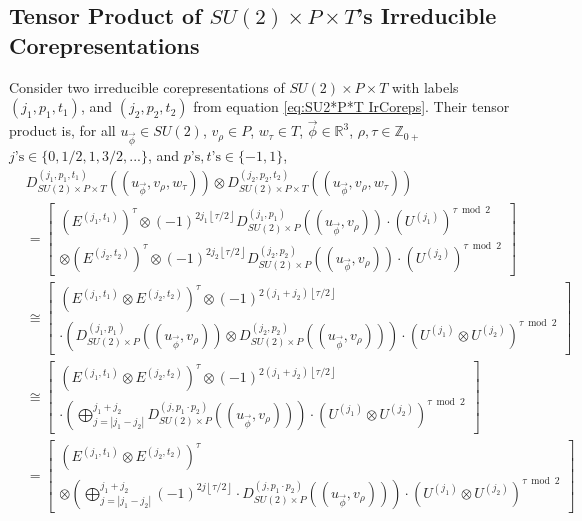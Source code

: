 \documentclass[preprint, 12pt]{revtex4-2}
\numberwithin{equation}{section}
\begin{document}
\subsection{Tensor Product of $SU(2)\times P\times T$'s Irreducible Corepresentations}
Consider two irreducible corepresentations of $SU(2)\times P\times T$ with labels $(j_1, p_1, t_1)$, and $(j_2, p_2, t_2)$ from equation \ref{eq:SU2*P*T IrCoreps}. Their tensor product is, for all $u_{\vec{\phi}}\in SU(2)$, $v_\rho \in P$, $w_\tau \in T$, $\vec{\phi}\in\mathbb{R}^3$, $\rho,\tau\in\mathbb{Z}_{0+}$ $j\text{'s}\in\{0, 1/2, 1, 3/2, ...\}$, and $p\text{'s}, t\text{'s}\in\{-1, 1\}$,
\begin{equation}
    \begin{aligned}
        &D^{(j_1,p_1,t_1)}_{SU(2)\times P\times T}((u_{\vec{\phi}}, v_\rho, w_\tau))\otimes D^{(j_2,p_2,t_2)}_{SU(2)\times P\times T}((u_{\vec{\phi}}, v_\rho, w_\tau)) \\
        &=  \left[\begin{multlined}
                \left(E^{(j_1,t_1)}\right)^\tau\otimes (-1)^{2j_1\left\lfloor \tau/2\right\rfloor} D_{SU(2)\times P}^{(j_1,p_1)}((u_{\vec{\phi}}, v_\rho))\cdot\left(U^{(j_1)}\right)^{\tau\bmod 2}\\ 
                \otimes \left(E^{(j_2,t_2)}\right)^\tau\otimes (-1)^{2j_2\left\lfloor \tau/2\right\rfloor}D_{SU(2)\times P}^{(j_2,p_2)}((u_{\vec{\phi}}, v_\rho))\cdot\left(U^{(j_2)}\right)^{\tau\bmod 2}
            \end{multlined}\right] \\
        &\cong  \left[\begin{multlined}
                    \left(E^{(j_1,t_1)}\otimes E^{(j_2,t_2)}\right)^\tau\otimes(-1)^{2(j_1+j_2)\left\lfloor \tau/2\right\rfloor}\\
                    \cdot \left(D_{SU(2)\times P}^{(j_1,p_1)}((u_{\vec{\phi}}, v_\rho))\otimes D_{SU(2)\times P}^{(j_2,p_2)}((u_{\vec{\phi}}, v_\rho))\right)\cdot\left(U^{(j_1)}\otimes U^{(j_2)}\right)^{\tau\bmod 2}
                \end{multlined}\right] \\
        &\cong  \left[\begin{multlined}
                    \left(E^{(j_1,t_1)}\otimes E^{(j_2,t_2)}\right)^\tau\otimes(-1)^{2(j_1+j_2)\left\lfloor \tau/2\right\rfloor}\\
                    \cdot \left(\bigoplus_{j=|j_1-j_2|}^{j_1+j_2}D_{SU(2)\times P}^{(j,p_1\cdot p_2)}((u_{\vec{\phi}}, v_\rho))\right)\cdot\left(U^{(j_1)}\otimes U^{(j_2)}\right)^{\tau\bmod 2}
                \end{multlined}\right] \\
        &=  \left[\begin{multlined}
                \left(E^{(j_1,t_1)}\otimes E^{(j_2,t_2)}\right)^\tau\\
                \otimes\left(\bigoplus_{j=|j_1-j_2|}^{j_1+j_2}(-1)^{2j\left\lfloor \tau/2\right\rfloor}\cdot D_{SU(2)\times P}^{(j,p_1\cdot p_2)}((u_{\vec{\phi}}, v_\rho))\right)\cdot\left(U^{(j_1)}\otimes U^{(j_2)}\right)^{\tau\bmod 2}
            \end{multlined}\right]
    \end{aligned}
\end{equation}
\end{document}
